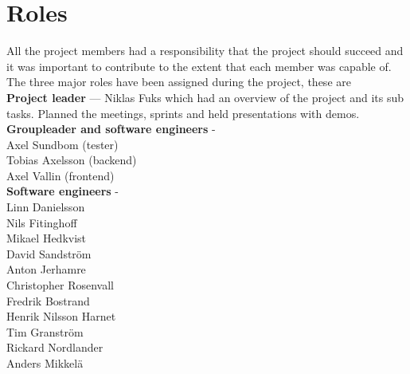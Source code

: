 \section{Roles} 
All the project members had a responsibility that the project should succeed and it was important to contribute to the extent that each member was capable of.\\
The three major roles have been assigned during the project, these are \\
\textbf{Project leader} --- Niklas Fuks which had an overview of the project and its sub tasks. Planned the meetings, sprints and held presentations with demos. \\
\textbf{Groupleader and software engineers} -\\
Axel Sundbom (tester)\\
Tobias Axelsson (backend) \\
Axel Vallin (frontend) \\
\textbf{Software engineers} -\\
Linn Danielsson\\
Nils Fitinghoff\\
Mikael Hedkvist\\
David Sandström\\
Anton Jerhamre\\
Christopher Rosenvall\\
Fredrik Bostrand\\
Henrik Nilsson Harnet\\
Tim Granström\\
Rickard Nordlander\\
Anders Mikkelä\\
